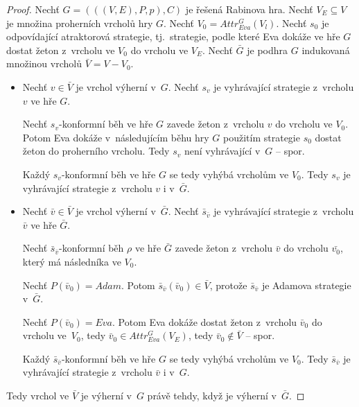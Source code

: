 \begin{proof}
Nechť $G = (((V, E), P, p), C)$ je řešená Rabinova hra. Nechť $V_E \subseteq V$ je množina proherních vrcholů hry $G$. Nechť $V_0 = Attr^G_{Eva}(V_l)$. Nechť $s_0$ je odpovídající atraktorová strategie, tj.~strategie, podle které Eva dokáže ve hře $G$ dostat žeton z~vrcholu ve $V_0$ do vrcholu ve $V_E$. Nechť $\bar{G}$ je podhra $G$ indukovaná množinou vrcholů $\bar{V} = V - V_0$.
\begin{itemize}
\item
Nechť $v \in \bar{V}$ je vrchol výherní v~$G$. Nechť $s_v$ je vyhrávající strategie z~vrcholu $v$ ve hře $G$.

Nechť $s_v$-konformní běh ve hře $G$ zavede žeton z~vrcholu $v$ do vrcholu ve $V_0$. Potom Eva dokáže v~následujícím běhu hry $G$ použitím strategie $s_0$ dostat žeton do proherního vrcholu. Tedy $s_v$ není vyhrávající v~$G$ -- spor.

Každý $s_v$-konformní běh ve hře $G$ se tedy vyhýbá vrcholům ve $V_0$. Tedy $s_v$ je vyhrávající strategie z~vrcholu $v$ i v~$\bar{G}$.
\item
Nechť $\bar{v} \in \bar{V}$ je vrchol výherní v~$\bar{G}$. Nechť $\bar{s}_{\bar{v}}$ je vyhrávající strategie z~vrcholu $\bar{v}$ ve hře $\bar{G}$.

Nechť $\bar{s}_{\bar{v}}$-konformní běh $\rho$ ve hře $\bar{G}$ zavede žeton z~vrcholu $\bar{v}$ do vrcholu $\bar{v_0}$, který má následníka ve $V_0$.

Nechť $P(\bar{v}_0) = Adam$. Potom $\bar{s}_{\bar{v}}(\bar{v}_0) \in \bar{V}$, protože $\bar{s}_{\bar{v}}$ je Adamova strategie v~$\bar{G}$.

Nechť $P(\bar{v}_0) = Eva$. Potom Eva dokáže dostat žeton z~vrcholu $\bar{v}_0$ do vrcholu ve~$V_0$, tedy $\bar{v}_0 \in Attr^G_{Eva}(V_E)$, tedy $\bar{v}_0 \notin \bar{V}$ -- spor.

Každý $\bar{s}_{\bar{v}}$-konformní běh ve hře $G$ se tedy vyhýbá vrcholům ve $V_0$. Tedy $\bar{s}_{\bar{v}}$ je vyhrávající strategie z~vrcholu $\bar{v}$ i v~$G$.
\end{itemize}
Tedy vrchol ve $\bar{V}$ je výherní v~$G$ právě tehdy, když je výherní v~$\bar{G}$.
\end{proof}